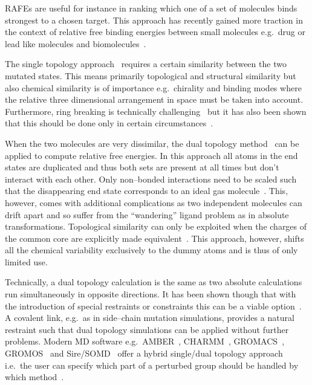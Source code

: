 \documentclass[journal=jctcce,manuscript=article]{achemso}
\begin{document}
RAFEs are useful for instance in ranking which one of a set of molecules binds 
strongest to a chosen target.  This approach has recently gained more traction 
in the context of relative free binding energies between small molecules e.g.\ 
drug or lead like molecules and biomolecules~\cite{doi:10.1021/ja512751q, 
doi:10.1021/acs.jctc.6b00991}.

The single topology approach~\cite{doi:10.1021/j100056a020} requires a
certain similarity between the two mutated states.  This means primarily
topological and structural similarity but also chemical similarity is
of importance e.g.\ chirality and binding modes where the relative
three dimensional arrangement in space must be taken into account.
Furthermore, ring breaking is technically
challenging~\cite{doi:10.1021/acs.jctc.6b00991} but it has also been
shown that this should be done only in certain
circumstances~\cite{doi:10.1021/acs.jcim.5b00057,
  doi:10.1021/jp994193s}.

When the two molecules are very dissimilar, the dual topology
method~\cite{doi:10.1021/j100056a020, doi:10.1021/jp981628n} can be
applied to compute relative free energies.  In this approach all atoms
in the end states are duplicated and thus both sets are present at all
times but don't interact with each other.  Only non--bonded
interactions need to be scaled such that the disappearing end state
corresponds to an ideal gas molecule~\cite{doi:10.1021/jp981628n}.
This, however, comes with additional complications as two independent
molecules can drift apart and so suffer from the ``wandering'' ligand
problem as in absolute transformations\cite{GILSON19971047,
doi:10.1021/jp0217839, deng_computations_2009}.  Topological
similarity can only be exploited when the charges of the common core
are explicitly made equivalent~\cite{doi:10.1021/acs.jctc.5b00179}.
This approach, however, shifts all the chemical variability
exclusively to the dummy atoms and is thus of only limited use.

Technically, a dual topology calculation is the same as two absolute
calculations run simultaneously in opposite directions.  It has been
shown though that with the introduction of special restraints or
constraints this can be a viable option~\cite{doi:10.1021/ct700081t,
  rocklin_separated_2013}.  A covalent link, e.g.\ as in side--chain
mutation simulations, provides a natural restraint such that dual
topology simulations can be applied without further problems.  Modern
MD software e.g.\ AMBER~\cite{case_amber_2005},
CHARMM~\cite{JCC:JCC21287}, GROMACS~\cite{Abraham201519},
GROMOS~\cite{doi:10.1021/jp984217f} and Sire/SOMD~\cite{Sire-2016,
  doi:10.1021/ct300857j} offer a hybrid single/dual topology approach
i.e.\ the user can specify which part of a perturbed group should be
handled by which method~\cite{doi:10.1021/jp994193s}.
\end{document}
